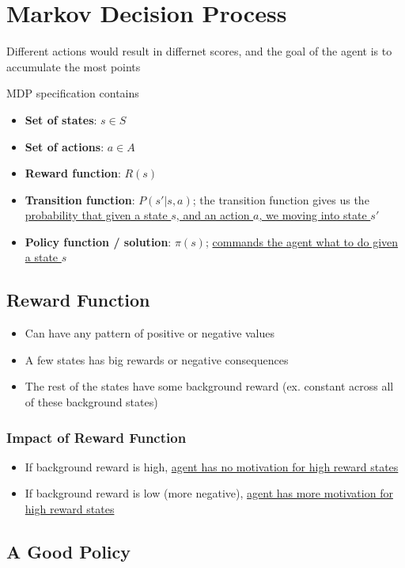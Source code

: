 \section{Markov Decision Process}

  Different actions would result in differnet scores, and the
  goal of the agent is to accumulate the most points

  MDP specification contains

  \begin{itemize}
    \item \textbf{Set of states}: $ s \in S $
    \item \textbf{Set of actions}: $ a \in A $
    \item \textbf{Reward function}: $ R\left( s \right) $
    \item \textbf{Transition function}: $ P\left( s' | s, a \right) $;
    the transition function gives us the \ul{probability that
    given a state $ s $, and an action $ a $, we moving into state $ s' $}
    \item \textbf{Policy function / solution}: $ \pi\left( s \right) $;
    \ul{commands the agent what to do given a state $ s $}
  \end{itemize}

  \subsection{Reward Function}

    \begin{itemize}
      \item Can have any pattern of positive or negative values
      \item A few states has big rewards or negative consequences
      \item The rest of the states have some background reward (ex.
      constant across all of these background states)
    \end{itemize}

    \subsubsection{Impact of Reward Function}

      \begin{itemize}
        \item If background reward is high, \ul{agent has no motivation
        for high reward states}
        \item If background reward is low (more negative), \ul{agent
        has more motivation for high reward states}
      \end{itemize}

  \subsection{A Good Policy}

